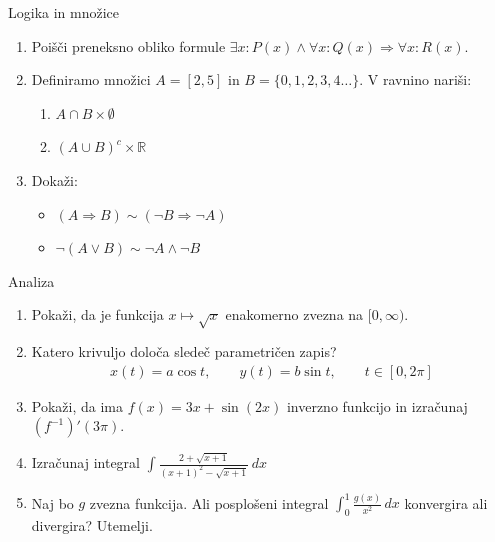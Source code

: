 \begin{frame}{Logika in množice}
	\begin{enumerate}
		\item
		Poišči preneksno obliko formule %
		\(\exists x : P(x)\wedge \forall x : Q(x) \Rightarrow \forall x : R(x). \)
		\item 
		Definiramo množici $A = [2,5]$ in $B = \{0, 1, 2, 3, 4\ldots\}$.
		V ravnino nariši:
		\begin{enumerate}
		   \item $A \cap B \times \emptyset$
		   \item $(A \cup B)^c \times \mathbb{R}$
		\end{enumerate}
		\item
		Dokaži:
		\begin{itemize}
			\item $(A \Rightarrow B) \sim (\neg B \Rightarrow \neg A)$
			\item $\neg(A \vee B) \sim \neg A \wedge \neg B$
		\end{itemize}
	\end{enumerate}
\end{frame}

\begin{frame}{Analiza}
	\begin{enumerate}
		\item
		Pokaži, da je funkcija $x \mapsto \sqrt{x}$ enakomerno zvezna na $[0,\infty)$.
		\item 
		Katero krivuljo določa sledeč parametričen zapis?
		   \begin{align*}
			x(t) = a \cos t, \qquad %
		   y(t) = b \sin t, \qquad %
		   t \in [0, 2 \pi]
			\end{align*}
		\item
		Pokaži, da ima $f(x) = 3x + \sin{(2x)}$ inverzno funkcijo in izračunaj $(f^{-1})'(3\pi)$.
		
		\item
		Izračunaj integral 
		\(\displaystyle \int \frac{2+\sqrt{x+1}}{(x+1)^2-\sqrt{x+1}} \, dx\)
		 
		\item 
		Naj bo $g$ zvezna funkcija. Ali posplošeni integral 
		\(\int_{0}^{1}\frac{g(x)}{x^2}\, dx\)
		konvergira ali divergira? Utemelji.
	\end{enumerate}
\end{frame}


